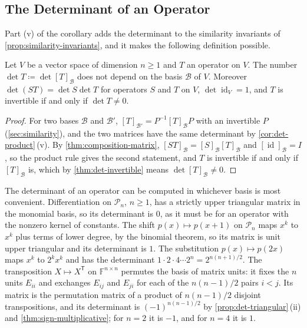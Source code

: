 \subsection{The Determinant of an Operator}

Part (v) of the corollary adds the determinant to the similarity invariants of \cref{prop:similarity-invariants}, and it makes the following definition possible.

\begin{proposition}
\label{prop:det-operator}
Let $V$ be a vector space of dimension $n\ge1$ and $T$ an operator on $V$. The number $\det T\coloneqq\det[T]_{\mathcal B}$ does not depend on the basis $\mathcal B$ of $V$. Moreover $\det(ST)=\det S\det T$ for operators $S$ and $T$ on $V$, $\det\operatorname{id}_V=1$, and $T$ is invertible if and only if $\det T\ne0$.
\end{proposition}

\begin{proof}
For two bases $\mathcal B$ and $\mathcal B'$, $[T]_{\mathcal B'}=P^{-1}[T]_{\mathcal B}P$ with an invertible $P$ (\cref{sec:similarity}), and the two matrices have the same determinant by \cref{cor:det-product}\,(v). By \cref{thm:composition-matrix}, $[ST]_{\mathcal B}=[S]_{\mathcal B}[T]_{\mathcal B}$ and $[\operatorname{id}]_{\mathcal B}=I$, so the product rule gives the second statement, and $T$ is invertible if and only if $[T]_{\mathcal B}$ is, which by \cref{thm:det-invertible} means $\det[T]_{\mathcal B}\ne0$.
\end{proof}

The determinant of an operator can be computed in whichever basis is most convenient. Differentiation on $\mathcal P_n$, $n\ge1$, has a strictly upper triangular matrix in the monomial basis, so its determinant is $0$, as it must be for an operator with the nonzero kernel of constants. The shift $p(x)\mapsto p(x+1)$ on $\mathcal P_n$ maps $x^k$ to $x^k$ plus terms of lower degree, by the binomial theorem, so its matrix is unit upper triangular and its determinant is $1$. The substitution $p(x)\mapsto p(2x)$ maps $x^k$ to $2^kx^k$ and has the determinant $1\cdot2\cdot4\cdots2^n=2^{n(n+1)/2}$. The transposition $X\mapsto X^{\mathsf T}$ on $\mathbb F^{n\times n}$ permutes the basis of matrix units: it fixes the $n$ units $E_{ii}$ and exchanges $E_{ij}$ and $E_{ji}$ for each of the $n(n-1)/2$ pairs $i<j$. Its matrix is the permutation matrix of a product of $n(n-1)/2$ disjoint transpositions, and its determinant is $(-1)^{n(n-1)/2}$ by \cref{prop:det-triangular}\,(ii) and \cref{thm:sign-multiplicative}; for $n=2$ it is $-1$, and for $n=4$ it is $1$.

